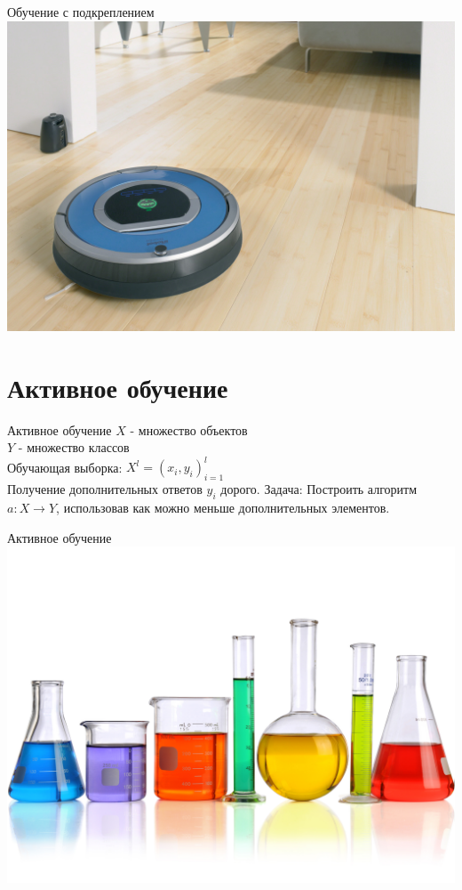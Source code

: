 \documentclass[10pt]{beamer}
\begin{document}
{
\begin{frame} {Обучение с подкреплением}
  \centering
  \includegraphics[width=0.9 \linewidth, height=0.9 \textheight, keepaspectratio]{images/roomba}\\
\end{frame}

\section{Активное обучение}

{
\begin{frame}{Активное обучение}
  $X$ - множество объектов \\
	$Y$ - множество классов \\
	Обучающая выборка: ${X^l = (x_i, y_i)_{i=1}^l}$ \\ 
	Получение дополнительных ответов $y_i$ \alert{дорого}.
	\bigbreak
	\bigbreak
	\alert{Задача}: Построить алгоритм ${a \colon X \rightarrow Y}$, использовав как можно меньше дополнительных элементов.
\end{frame}
}

{
\begin{frame}{Активное обучение}
  \centering
  \includegraphics[width=0.9 \linewidth, height=0.9 \textheight, keepaspectratio]{images/active}\\
\end{frame}

}}
\end{document}
